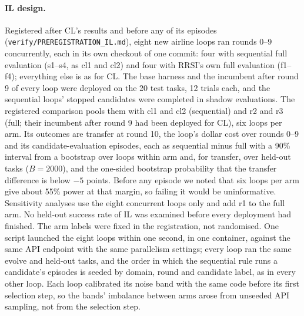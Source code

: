 \documentclass[11pt]{article}
\begin{document}
\paragraph{IL design.} Registered after CL's results and before any of its episodes (\texttt{verify/PREREGISTRATION\_IL.md}), eight new airline loops ran rounds 0--9 concurrently, each in its own checkout of one commit: four with sequential full evaluation (s1--s4, as cl1 and cl2) and four with RRSI's own full evaluation (f1--f4); everything else is as for CL. The base harness and the incumbent after round 9 of every loop were deployed on the 20 test tasks, 12 trials each, and the sequential loops' stopped candidates were completed in shadow evaluations. The registered comparison pools them with cl1 and cl2 (sequential) and r2 and r3 (full; their incumbent after round 9 had been deployed for CL), six loops per arm. Its outcomes are transfer at round 10, the loop's dollar cost over rounds 0--9 and its candidate-evaluation episodes, each as sequential minus full with a 90\% interval from a bootstrap over loops within arm and, for transfer, over held-out tasks ($B=2000$), and the one-sided bootstrap probability that the transfer difference is below $-5$ points. Before any episode we noted that six loops per arm give about 55\% power at that margin, so failing it would be uninformative. Sensitivity analyses use the eight concurrent loops only and add r1 to the full arm. No held-out success rate of IL was examined before every deployment had finished. The arm labels were fixed in the registration, not randomised. One script launched the eight loops within one second, in one container, against the same API endpoint with the same parallelism settings; every loop ran the same evolve and held-out tasks, and the order in which the sequential rule runs a candidate's episodes is seeded by domain, round and candidate label, as in every other loop. Each loop calibrated its noise band with the same code before its first selection step, so the bands' imbalance between arms arose from unseeded API sampling, not from the selection step.

\begin{table}[t]
\centering\small
\setlength{\tabcolsep}{3pt}
\caption{The registered comparison of independent airline loops, rounds 0--9: accepted changes, candidate-evaluation episodes, the loop's dollar cost at list prices, and transfer at round 10 (held-out success of the incumbent after round 9 minus the base, points). Intervals: bootstrap over loops within arm and, for transfer, held-out tasks. f1--f4 and s1--s4 ran concurrently from one commit.}
\label{tab:il}
\end{table}
\end{document}
